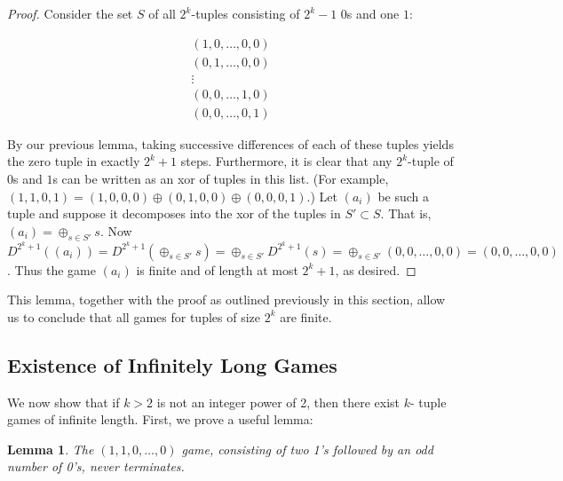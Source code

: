 \documentclass[12pt]{amsart}
\newtheorem{lemma}[theorem]{Lemma}
\newcommand{\xor}{\oplus}
\begin{document}
\begin{proof}
Consider the set $S$ of all $2^k$-tuples consisting of $2^k-1$ $0$s and one $1$:

$$\begin{array}{c}
(1,0,\ldots,0,0) \\
(0,1,\ldots,0,0) \\
\vdots \\
(0,0,\ldots,1,0) \\
(0,0,\ldots,0,1)
\end{array}$$

By our previous lemma, taking successive differences of each of these tuples yields the zero tuple in exactly $2^k+1$ steps. Furthermore, it is clear that any $2^k$-tuple of $0$s and $1$s can be written as an xor of tuples in this list. (For example, $(1,1,0,1)=(1,0,0,0)\xor(0,1,0,0)\xor(0,0,0,1)$.) Let $(a_i)$ be such a tuple and suppose it decomposes into the xor of the tuples in $S'\subset S$. That is, $(a_i)=\xor_{s\in S'} s$. Now $D^{2^k+1}((a_i))=D^{2^k+1}(\xor_{s\in S'} s)=\xor_{s\in S'} D^{2^k+1}(s)=\xor_{s\in S'} (0,0,\ldots,0,0) = (0,0,\ldots,0,0)$. Thus the game $(a_i)$ is finite and of length at most $2^k+1$, as desired.
\end{proof}

This lemma, together with the proof as outlined previously in this section, allow us to conclude that all games for tuples of size $2^k$ are finite.

\subsection{Existence of Infinitely Long Games}

We now show that if $k > 2$ is not an integer power of 2, then there exist $k$- tuple games of infinite length. First, we prove a useful lemma:

\begin{lemma}
The $(1, 1, 0, \ldots, 0)$ game, consisting of two 1's followed by an odd number of 0's, never terminates.
\label{lem:evenodds}
\end{lemma}
\end{document}
